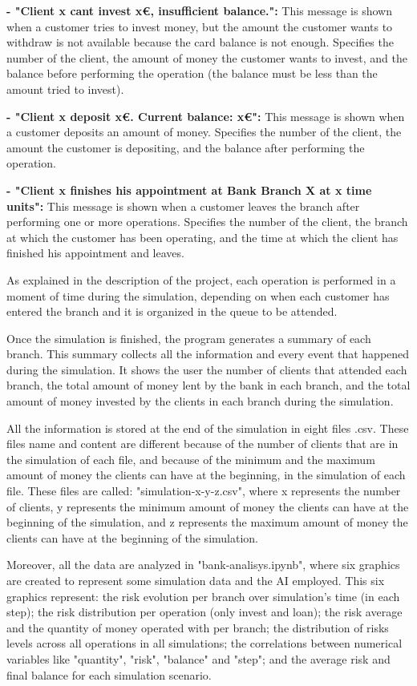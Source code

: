 \documentclass[titlepage, 12pt]{article}
\begin{document}
\textbf{- "Client x cant invest x€, insufficient balance.":} This message is shown when a customer tries to invest money, but the amount the customer wants to withdraw is not available because the card balance is not enough. Specifies the number of the client, the amount of money the customer wants to invest, and the balance before performing the operation (the balance must be less than the amount tried to invest).

\textbf{- "Client x deposit x€. Current balance: x€":} This message is shown when a customer deposits an amount of money. Specifies the number of the client, the amount the customer is depositing, and the balance after performing the operation.

\textbf{- "Client x finishes his appointment at Bank Branch X at x time units":} This message is shown when a customer leaves the branch after performing one or more operations. Specifies the number of the client, the branch at which the customer has been operating, and the time at which the client has finished his appointment and leaves.

As explained in the description of the project, each operation is performed in a moment of time during the simulation, depending on when each customer has entered the branch and it is organized in the queue to be attended.

Once the simulation is finished, the program generates a summary of each branch. This summary collects all the information and every event that happened during the simulation. It shows the user the number of clients that attended each branch, the total amount of money lent by the bank in each branch, and the total amount of money invested by the clients in each branch during the simulation. 

All the information is stored at the end of the simulation in eight files .csv. These files name and content are different because of the number of clients that are in the simulation of each file, and because of the minimum and the maximum amount of money the clients can have at the beginning, in the simulation of each file. These files are called: "simulation-x-y-z.csv", where x represents the number of clients, y represents the minimum amount of money the clients can have at the beginning of the simulation, and z represents the maximum amount of money the clients can have at the beginning of the simulation.

Moreover, all the data are analyzed in "bank-analisys.ipynb", where six graphics are created to represent some simulation data and the AI employed. This six graphics represent: the risk evolution per branch over simulation's time (in each step); the risk distribution per operation (only invest and loan); the risk average and the quantity of money operated with per branch; the distribution of risks levels across all operations in all simulations; the correlations between numerical variables like "quantity", "risk", "balance" and "step"; and the average risk and final balance for each simulation scenario.
\end{document}
